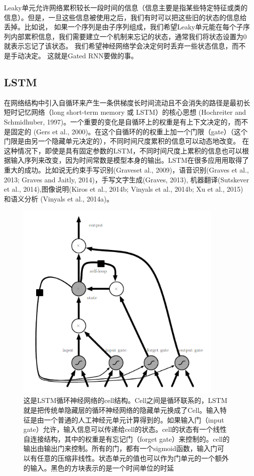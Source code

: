 Leaky单元允许网络累积较长一段时间的信息（信息主要是指某些特定特征或类的信息）。但是，一旦这些信息被使用之后，我们有时可以把这些旧的状态的信息给丢掉。比如说，
如果一个序列是由子序列组成，我们希望Leaky单元能在每个子序列内部累积信息，我们需要建立一个机制来忘记的状态，通常我们将状态设置为0就表示忘记了该状态。
我们希望神经网络学会决定何时丢弃一些状态信息，而不是手动决定。
这就是Gated RNN要做的事。

\subsection{LSTM}
\label{sec:10.10.1}
在网络结构中引入自循环来产生一条供梯度长时间流动且不会消失的路径是最初长短时记忆网络（long short-term memory 或 LSTM）的核心思想 (Hochreiter and Schmidhuber, 1997)。一个重要的变化是自循环上的权重是有上下文决定的，而不是固定的 (Gers et al., 2000)。在这个自循环的的权重上加一个门限（gate）（这个门限是由另一个隐藏单元决定的），不同时间尺度累积的信息可以动态地改变。
在这种情况下，即使是具有固定参数的LSTM，不同时间尺度上累积的信息也可以根据输入序列来改变，因为时间常数是模型本身的输出。LSTM在很多应用用取得了重大的成功。比如说无约束手写识别(Graveset al., 2009)，语音识别(Graves et al., 2013; Graves and Jaitly, 2014)，手写文字生成(Graves, 2013), 机器翻译(Sutskever et al., 2014),图像说明(Kiros et al., 2014b; Vinyals et al., 2014b; Xu et al., 2015) 和语义分析 (Vinyals et al., 2014a)。
\begin{figure}[htbp] %
   \centering
   \includegraphics[width=4in]{fig/chap10/10_16.PNG} 
   \caption{这是LSTM循环神经网络的cell结构。Cell之间是循环联系的，LSTM就是把传统单隐藏层的循环神经网络的隐藏单元换成了Cell。输入特征是由一个普通的人工神经元单元计算得到的。如果输入门（input gate）允许，输入信息可以传递给cell的状态。cell的状态有一个线性自连接结构，其中的权重是有忘记门（forget gate）来控制的。cell的输出由输出门来控制。所有的门，都有一个sigmoid函数，输入门可以有任意的压缩非线性。状态单元的值也可以作为门单元的一个额外的输入。黑色的方块表示的是一个时间单位的时延}
   \label{fig:10_16}
\end{figure}

